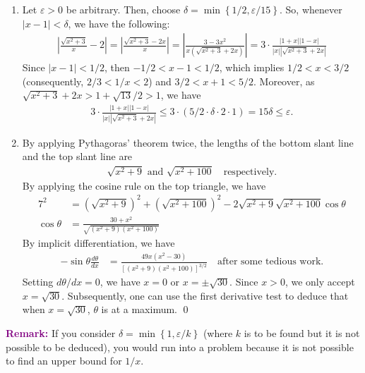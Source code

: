 \documentclass[12pt]{article}
\begin{document}
\begin{enumerate}[label=\textbf{(\alph*)}]
    \itemsep 0em
    \item Let $\varepsilon>0$ be arbitrary. Then, choose $\delta=\operatorname{min}\left\{1/2,\varepsilon/15\right\}$. So, whenever $\left|x-1\right|<\delta$, we have the following: 
    \begin{align*}
        \left|\frac{\sqrt{x^2+3}}{x}-2\right|=\left|\frac{\sqrt{x^2+3}-2x}{x}\right|=\left|\frac{3-3x^2}{x\left(\sqrt{x^2+3}+2x\right)}\right|=3\cdot \frac{\left|1+x\right|\left|1-x\right|}{\left|x\right|\left|\sqrt{x^2+3}+2x\right|}
    \end{align*}
    Since $\left|x-1\right|<1/2$, then $-1/2<x-1<1/2$, which implies $1/2<x<3/2$ (consequently, $2/3<1/x<2$) and $3/2<x+1<5/2$. Moreover, as $\sqrt{x^2+3}+2x>1+\sqrt{13}/2>1$, we have \begin{align*}
        3\cdot \frac{\left|1+x\right|\left|1-x\right|}{\left|x\right|\left|\sqrt{x^2+3}+2x\right|}\le 3\cdot \left(5/2\cdot \delta\cdot 2 \cdot 1\right)=15\delta\le\varepsilon.
    \end{align*}
    \item By applying Pythagoras' theorem twice, the lengths of the bottom slant line and the top slant line are \begin{align*}
        \sqrt{x^2+9}\text{ and }\sqrt{x^2+100}\quad\text{respectively}.
    \end{align*}
    By applying the cosine rule on the top triangle, we have \begin{align*}
        7^2&=\left(\sqrt{x^2+9}\right)^2+\left(\sqrt{x^2+100}\right)^2-2\sqrt{x^2+9}\sqrt{x^2+100}\operatorname{cos}\theta\\
        \operatorname{cos}\theta&=\frac{30+x^2}{\sqrt{\left(x^2+9\right)\left(x^2+100\right)}}
    \end{align*}
    By implicit differentiation, we have \begin{align*}
        -\operatorname{sin}\theta\frac{d\theta}{dx}&=\frac{49x\left(x^2-30\right)}{\left[\left(x^2+9\right)\left(x^2+100\right)\right]^{3/2}}\quad\text{after some tedious work}.
    \end{align*}
    Setting $d\theta/dx=0$, we have $x=0$ or $x=\pm \sqrt{30}$. Since $x>0$, we only accept $x=\sqrt{30}$. Subsequently, one can use the first derivative test to deduce that when $x=\sqrt{30}$, $\theta$ is at a maximum. \qed 
\end{enumerate}
\textbf{\textsf{\textcolor{purple}{Remark:}}} If you consider $\delta=\operatorname{min}\left\{1,\varepsilon/k\right\}$ (where $k$ is to be found but it is not possible to be deduced), you would run into a problem because it is not possible to find an upper bound for $1/x$.
\end{document}
